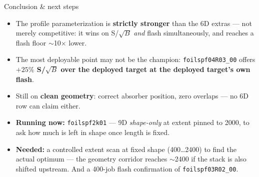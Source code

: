 \documentclass[aspectratio=169,10pt]{beamer}
\begin{document}
\begin{frame}{Conclusion \& next steps}
\begin{itemize}
  \item The profile parameterization is \textbf{strictly stronger} than the 6D
        extras --- not merely competitive: it wins on S/$\sqrt{B}$ \emph{and} flash
        simultaneously, and reaches a flash floor $\sim$10$\times$ lower.
  \vspace{0.4em}
  \item The most deployable point may not be the champion:
        \texttt{foilspf04R03\_00} offers \textbf{$+25\%$ S/$\sqrt{B}$ over the
        deployed target at the deployed target's own flash}.
  \vspace{0.4em}
  \item Still on \textbf{clean geometry}: correct absorber position, zero
        overlaps --- no 6D row can claim either.
  \vspace{0.4em}
  \item \textbf{Running now:} \texttt{foilspf2k01} --- 9D \emph{shape-only} at extent
        pinned to 2000, to ask how much is left in shape once length is fixed.
  \vspace{0.4em}
  \item \textbf{Needed:} a controlled extent scan at fixed shape (400\ldots2400) to
        find the actual optimum --- the geometry corridor reaches $\sim$2400 if the
        stack is also shifted upstream. And a 400-job flash confirmation of
        \texttt{foilspf03R02\_00}.
\end{itemize}
\end{frame}
\end{document}
